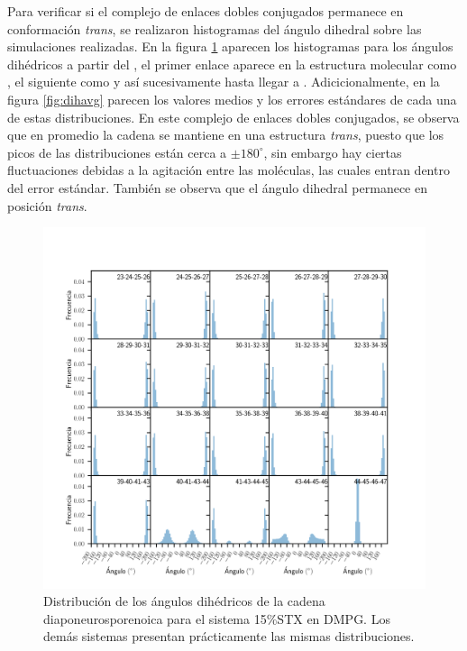 Para verificar si el complejo de enlaces dobles conjugados permanece en conformaci\'{o}n \textit{trans}, se realizaron histogramas del \'{a}ngulo dihedral sobre las simulaciones realizadas. En la figura \ref{fig:dihdist} aparecen los histogramas para los  \'{a}ngulos dih\'{e}dricos a partir del , el primer enlace aparece en la estructura molecular como , el siguiente como  y as\'{i} sucesivamente hasta llegar a . Adicicionalmente, en la figura \ref{fig:dihavg} parecen los valores medios y los errores est\'{a}ndares de cada una de estas distribuciones. En este complejo de enlaces dobles conjugados, se observa que en promedio la cadena se mantiene en una estructura \textit{trans}, puesto que los picos de las distribuciones est\'{a}n cerca a $\pm 180^{\circ}$, sin embargo hay ciertas fluctuaciones debidas a la agitaci\'{o}n entre las mol\'{e}culas, las cuales entran dentro del error est\'{a}ndar. Tambi\'{e}n se observa que el \'{a}ngulo dihedral  permanece en posici\'{o}n \textit{trans}.\\
\begin{figure}[t]
\begin{center}
    \includegraphics[scale=0.32,trim={0 3cm 0 4cm},clip]{Plots/dihedral_15STX-DMPG.png}
  \caption{Distribuci\'{o}n de los \'{a}ngulos dih\'{e}dricos de la cadena diaponeurosporenoica para el sistema 15\%STX en DMPG. Los dem\'{a}s sistemas presentan pr\'{a}cticamente las mismas distribuciones.}
  \label{fig:dihdist}
\end{center}
\end{figure}

